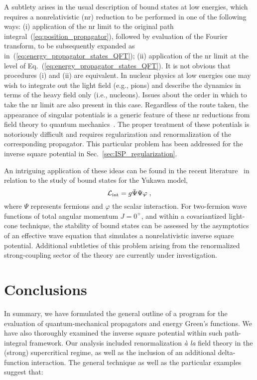 \documentclass[a4paper,preprint,draft,showpacs,amsmath,amsfonts,amssymb,aps,prd]{revtex4}%
\begin{document}
A subtlety arises in
the usual description of bound states at low energies, which requires a
nonrelativistic (nr) reduction to be performed in 
one of the following ways:
(i) application of the nr limit
to the original path integral~(\ref{eq:position_propagator}),
followed by evaluation of the Fourier transform, to be
subsequently expanded as in~(\ref{eq:energy_propagator_states_QFT});
(ii) application of the nr limit
at the level of Eq.~(\ref{eq:energy_propagator_states_QFT}).
It is not obvious that procedures (i) and (ii) are equivalent.
In nuclear physics at low energies one may wish
to integrate out the light field 
(e.g., pions) and describe the dynamics in terms of the heavy field only (i.e.,
nucleons). Issues about the order in which to take the nr limit are also
present in this case. 
Regardless of the route taken, the appearance of
singular potentials is a generic feature of these nr reductions from field
theory to quantum mechanics~\cite{Stevenson,Beane}. 
The proper treatment
of these potentials is notoriously difficult and requires regularization and
renormalization of the corresponding  propagator.
This particular problem has been addressed for the inverse square potential in
Sec.~\ref{sec:ISP_regularization}.

An intriguing application of these ideas can be found in the recent 
literature~\cite{car:01}
 in relation to the study
of bound states for the Yukawa model,
\begin{equation}
{\cal L}_{\rm int}
=
g \bar{\Psi} \Psi 
\varphi
\;  ,
\end{equation}
where $\Psi$ represents
fermions and $\varphi$ the scalar interaction. 
For two-fermion wave functions of total angular momentum
$ J= 0^{+}$,
and within a covariantized light-cone
technique,  the stability of  bound states can be assessed
by the asymptotics of an effective wave equation that  simulates a
nonrelativistic inverse square potential.
Additional subtleties 
of this problem arising from the renormalized strong-coupling
sector of the theory are currently under investigation.



\section{Conclusions}
\label{sec:conclusions}


In summary, we have formulated the general outline of a program for the evaluation 
of quantum-mechanical propagators and energy Green's functions.
We have also thoroughly examined the inverse square potential
within such path-integral framework.
Our analysis included renormalization {\it \`{a} la\/} field theory
in the (strong) supercritical regime, as well as the inclusion of an additional
delta-function interaction.
The general technique as well as the particular examples
suggest that: 
\end{document}
